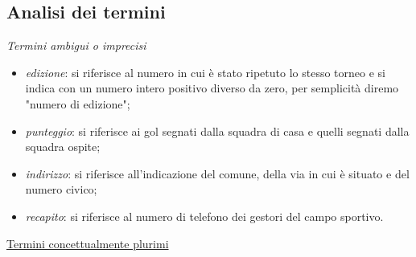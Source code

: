 \documentclass[11pt, openany]{article}
\theoremstyle{definition}
\theoremstyle{plain}
\theoremstyle{remark}
\begin{document}
			\subsection{Analisi dei termini}
				\textit{Termini ambigui o imprecisi}
				\begin{itemize}
					\item\textit{edizione}: si riferisce al numero in cui è stato ripetuto lo stesso torneo e si indica con un numero intero positivo diverso da zero, per semplicità diremo "numero di edizione";
					\item\textit{punteggio}: si riferisce ai gol segnati dalla squadra di casa e quelli segnati dalla squadra ospite;
					\item\textit{indirizzo}: si riferisce all’indicazione del comune, della via in cui è situato e del numero civico;
					\item\textit{recapito}: si riferisce al numero di telefono dei gestori del campo sportivo.
				\end{itemize}
				\vspace{7pt}
				\underline{Termini concettualmente plurimi}
\end{document}
